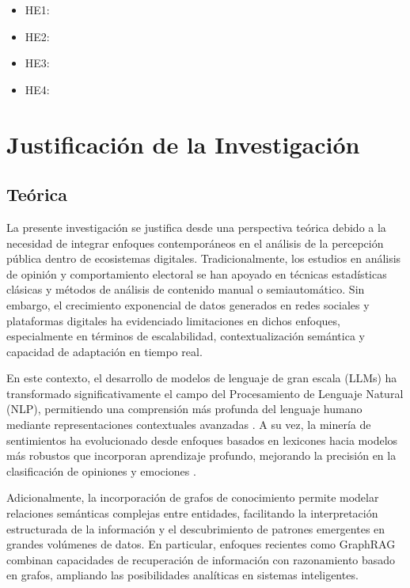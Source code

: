 \documentclass[listof=nochaptergap,12pt,times,authoryear]{report}
\begin{document}
\begin{itemize}
	\item HE1: \Hone
	\item HE2: \Htwo
	\item HE3: \Hthree
	\item HE4: \Hfour
\end{itemize}


\section{Justificación de la Investigación}

\subsection{Teórica}

La presente investigación se justifica desde una perspectiva teórica debido a la necesidad de integrar enfoques contemporáneos en el análisis de la percepción pública dentro de ecosistemas digitales. Tradicionalmente, los estudios en análisis de opinión y comportamiento electoral se han apoyado en técnicas estadísticas clásicas y métodos de análisis de contenido manual o semiautomático. Sin embargo, el crecimiento exponencial de datos generados en redes sociales y plataformas digitales ha evidenciado limitaciones en dichos enfoques, especialmente en términos de escalabilidad, contextualización semántica y capacidad de adaptación en tiempo real.

En este contexto, el desarrollo de modelos de lenguaje de gran escala (LLMs) ha transformado significativamente el campo del Procesamiento de Lenguaje Natural (NLP), permitiendo una comprensión más profunda del lenguaje humano mediante representaciones contextuales avanzadas \parencite{pr_devlin2019bert, pr_brown2020gpt3}. A su vez, la minería de sentimientos ha evolucionado desde enfoques basados en lexicones hacia modelos más robustos que incorporan aprendizaje profundo, mejorando la precisión en la clasificación de opiniones y emociones \parencite{pr_pang2008opinion}.

Adicionalmente, la incorporación de grafos de conocimiento permite modelar relaciones semánticas complejas entre entidades, facilitando la interpretación estructurada de la información y el descubrimiento de patrones emergentes en grandes volúmenes de datos. En particular, enfoques recientes como GraphRAG combinan capacidades de recuperación de información con razonamiento basado en grafos, ampliando las posibilidades analíticas en sistemas inteligentes.
\end{document}
